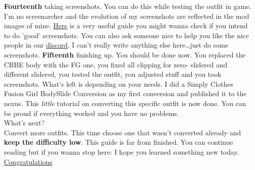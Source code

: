 \textbf{Fourteenth} taking screenshots. You can do this while testing the outfit in game. I'm no screenarcher and the evolution of 
my screenshots are reflected in the mod images of mine. \href{https://steamcommunity.com/sharedfiles/filedetails/?id=172301317}{Here} 
is a very useful guide you might wanna check if you intend to do 'good' screenshots. You can also ask someone nice to help you like 
the nice people in our \href{https://discord.gg/JakcQPN}{discord}. I can't really write anything else here\dots just do some screenshots.
\textbf{Fifteenth} finishing up. You should be done now. You replaced the CBBE body with the FG one, you fixed all clipping for zero-
slidered and different slidered, you tested the outfit, you adjusted stuff and you took screenshots. What's left is depending on your needs.
I did a Simply Clothes Fusion Girl BodySlide Conversion as my first conversion and published it to the nexus. This \textit{little} 
tutorial on converting this specific outfit is now done. You can be proud if everything worked and you have no problems.\\
What's next?\\
Convert more outfits. This time choose one that wasn't converted already and \textbf{keep the difficulty low}. This guide is far from 
finished. You can continue reading but if you wanna stop here: I hope you learned something new today.
\href{https://www.youtube.com/watch?v=3NuFVQk_CCs}{Congratulations}\\